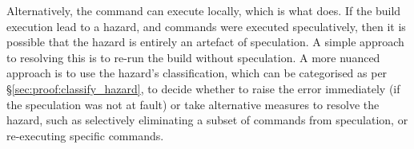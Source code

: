 Alternatively, the command can execute locally, which is what \Rattle does. If the build execution lead to a hazard, and commands were executed speculatively, then it is possible that the hazard is entirely an artefact of speculation.  A simple approach to resolving this is to re-run the build without speculation.  A more nuanced approach is to use the hazard's classification, which can be categorised as per \S\ref{sec:proof:classify_hazard}, to decide whether to raise the error immediately (if the speculation was not at fault) or take alternative measures to resolve the hazard, such as selectively eliminating a subset of commands from speculation, or re-executing specific commands.









